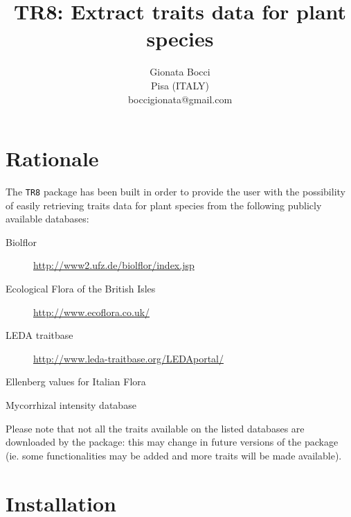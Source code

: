 \documentclass{article}
\title{TR8: Extract traits data for plant species}
\author{Gionata Bocci\\Pisa (ITALY)\\ {boccigionata@gmail.com}}
\begin{document}
\maketitle



\section{Rationale}
\label{sec:rationale}

The \texttt{TR8} package has been built in order to provide the user with the
possibility of easily retrieving traits data for plant species from the following publicly available databases:

\begin{description}
\item[Biolflor] \url{http://www2.ufz.de/biolflor/index.jsp} \cite{biolflor}
\item[Ecological Flora of the British Isles] \url{http://www.ecoflora.co.uk/} \cite{ecoflora}
\item[LEDA traitbase] \url{http://www.leda-traitbase.org/LEDAportal/} \cite{leda}
\item[Ellenberg values for Italian Flora] \cite{pignatti}
\item[Mycorrhizal intensity database] \cite{amf}
\end{description}

  Please note that not all the traits available on the listed
  databases are downloaded by the package: this may change in future
  versions of the package (ie. some functionalities may be added and
  more traits will be made available).

\section{Installation}
\label{sec:installation}


   
  
\end{document}
